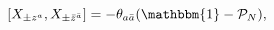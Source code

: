 \begin{equation}\label{eq:commutator}
 [X_{\pm z^a},X_{\pm\bar{z}^{\bar{a}}}]=-\theta_{a\bar{a}}
 (\mathbbm{1}-\mathcal{P}_N),
\end{equation}

